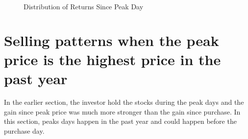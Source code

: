 \clearpage



\begin{figure}%
	\centering%
	\caption{Distribution of Returns Since Peak Day }%
	\label{fig:hist_return_peak}%
	\fignote{  }
\end{figure}

\clearpage
\clearpage

\section{Selling patterns when the peak price is the highest price in the past year}

In the earlier section, the investor hold the stocks during the peak days and the gain since peak price was much more stronger than the gain since purchase. In this section, peaks days happen in the past year and could happen before the purchase day.

